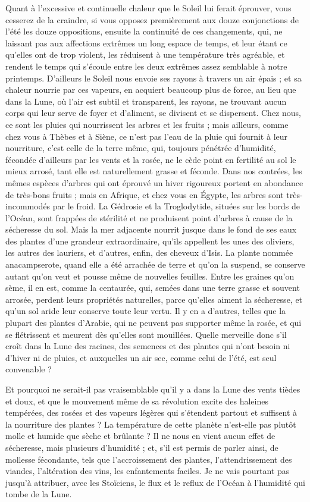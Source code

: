 \documentclass[a4paper, 11pt, oneside, landscape]{article}
\begin{document}
Quant à l'excessive et continuelle chaleur que le Soleil lui ferait éprouver, vous cesserez de la craindre, si vous opposez premièrement aux douze conjonctions de l'été les douze oppositions, ensuite la continuité de ces changements, qui, ne laissant pas aux affections extrêmes un long espace de temps, et leur étant ce qu'elles ont de trop violent, les réduisent à une température très agréable, et rendent le temps qui s'écoule entre les deux extrêmes assez semblable à notre printemps. D'ailleurs le Soleil nous envoie ses rayons à travers un air épais ; et sa chaleur nourrie par ces vapeurs, en acquiert beaucoup plus de force, au lieu que dans la Lune, où l'air est subtil et transparent, les rayons, ne trouvant aucun corps qui leur serve de foyer et d'aliment, se divisent et se dispersent. Chez nous, ce sont les pluies qui nourrissent les arbres et les fruits ; mais ailleurs, comme chez vous à Thèbes et à Siène, ce n'est pas l'eau de la pluie qui fournit à leur nourriture, c'est celle de la terre même, qui, toujours pénétrée d'humidité, fécondée d'ailleurs par les vents et la rosée, ne le cède point en fertilité au sol le mieux arrosé, tant elle est naturellement grasse et féconde. Dans nos contrées, les mêmes espèces d'arbres qui ont éprouvé un hiver rigoureux portent en abondance de très-bons fruits ; mais en Afrique, et chez vous en Égypte, les arbres sont très-incommodés par le froid. La Gédrosie et la Troglodytide, situées sur les bords de l'Océan, sont frappées de stérilité et ne produisent point d'arbres à cause de la sécheresse du sol. Mais la mer adjacente nourrit jusque dans le fond de ses eaux des plantes d'une grandeur extraordinaire, qu'ils appellent les unes des oliviers, les autres des lauriers, et d'autres, enfin, des cheveux d'Isis. La plante nommée anacampserote, quand elle a été arrachée de terre et qu'on la suspend, se conserve autant qu'on veut et pousse même de nouvelles feuilles. Entre les graines qu'on sème, il en est, comme la centaurée, qui, semées dans une terre grasse et souvent arrosée, perdent leurs propriétés naturelles, parce qu'elles aiment la sécheresse, et qu'un sol aride leur conserve toute leur vertu. Il y en a d'autres, telles que la plupart des plantes d'Arabie, qui ne peuvent pas supporter même la rosée, et qui se flétrissent et meurent dès qu'elles sont mouillées. Quelle merveille donc s'il croît dans la Lune des racines, des semences et des plantes qui n'ont besoin ni d'hiver ni de pluies, et auxquelles un air sec, comme celui de l'été, est seul convenable ?

Et pourquoi ne serait-il pas vraisemblable qu'il y a dans la Lune des vents tièdes et doux, et que le mouvement même de sa révolution excite des haleines tempérées, des rosées et des vapeurs légères qui s'étendent partout et suffisent à la nourriture des plantes ? La température de cette planète n'est-elle pas plutôt molle et humide que sèche et brûlante ? Il ne nous en vient aucun effet de sécheresse, mais plusieurs d'humidité ; et, s'il est permis de parler ainsi, de mollesse fécondante, tels que l'accroissement des plantes, l'attendrissement des viandes, l'altération des vins, les enfantements faciles. Je ne vais pourtant pas jusqu'à attribuer, avec les Stoïciens, le flux et le reflux de l'Océan à l'humidité qui tombe de la Lune.
\end{document}

